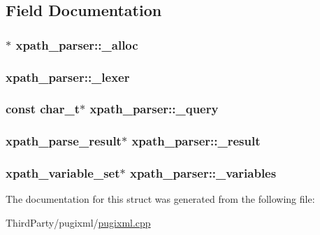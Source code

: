 \subsection{Field Documentation}
\hypertarget{structxpath__parser_ac34f5b21ef406bec944286eee2f45836}{
\subsubsection[{\-\_\-alloc}]{$\ast$ xpath\-\_\-parser\-::\-\_\-alloc}}\label{structxpath__parser_ac34f5b21ef406bec944286eee2f45836}
\hypertarget{structxpath__parser_a50106db584946e67acd080ef5391a0f4}{
\subsubsection[{\-\_\-lexer}]{ xpath\-\_\-parser\-::\-\_\-lexer}}\label{structxpath__parser_a50106db584946e67acd080ef5391a0f4}
\hypertarget{structxpath__parser_aaf5ea5d5be97cdd93adc7a719d8edc1c}{
\subsubsection[{\-\_\-query}]{\setlength{\rightskip}{0pt plus 5cm}const char\-\_\-t$\ast$ xpath\-\_\-parser\-::\-\_\-query}}\label{structxpath__parser_aaf5ea5d5be97cdd93adc7a719d8edc1c}
\hypertarget{structxpath__parser_a9370fb875bfc49ca6e35f3165ecb1692}{
\subsubsection[{\-\_\-result}]{\setlength{\rightskip}{0pt plus 5cm}xpath\-\_\-parse\-\_\-result$\ast$ xpath\-\_\-parser\-::\-\_\-result}}\label{structxpath__parser_a9370fb875bfc49ca6e35f3165ecb1692}
\hypertarget{structxpath__parser_a3e0adfea7cc81c08b97ee1375831df6c}{
\subsubsection[{\-\_\-variables}]{\setlength{\rightskip}{0pt plus 5cm}xpath\-\_\-variable\-\_\-set$\ast$ xpath\-\_\-parser\-::\-\_\-variables}}\label{structxpath__parser_a3e0adfea7cc81c08b97ee1375831df6c}


The documentation for this struct was generated from the following file\-:\begin{DoxyCompactItemize}
\item 
Third\-Party/pugixml/\hyperlink{pugixml_8cpp}{pugixml.\-cpp}\end{DoxyCompactItemize}
